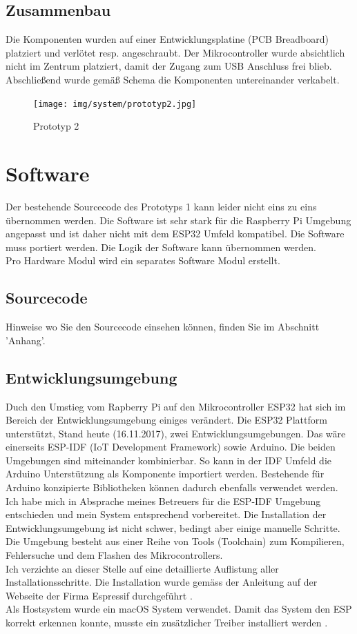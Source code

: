 \documentclass[11pt,english,german]{report}
\theoremstyle{definition}
\begin{document}
\newpage
\subsection{Zusammenbau}
Die Komponenten wurden auf einer Entwicklungsplatine (PCB Breadboard) platziert und verlötet resp. angeschraubt. Der Mikrocontroller wurde absichtlich nicht im Zentrum platziert, damit der Zugang zum USB Anschluss frei blieb. Abschließend wurde gemäß Schema die Komponenten untereinander verkabelt.\\
\begin{figure}[H]
	\centering
	\texttt{[image: img/system/prototyp2.jpg]}
	\caption[Prototyp 2]
	{Prototyp 2}
\end{figure}

\newpage
\section{Software}
Der bestehende Sourcecode des Prototyps 1 kann leider nicht eins zu eins übernommen werden. Die Software ist sehr stark für die Raspberry Pi Umgebung angepasst und ist daher nicht mit dem ESP32 Umfeld kompatibel. Die Software muss portiert werden. Die Logik der Software kann übernommen werden.\\[0.3cm]
Pro Hardware Modul wird ein separates Software Modul erstellt.

\subsection{Sourcecode}
Hinweise wo Sie den Sourcecode einsehen können, finden Sie im Abschnitt 'Anhang'.

\subsection{Entwicklungsumgebung}
Duch den Umstieg vom Rapberry Pi auf den Mikrocontroller ESP32 hat sich im Bereich der Entwicklungsumgebung einiges verändert. Die ESP32 Plattform unterstützt, Stand heute (16.11.2017), zwei Entwicklungsumgebungen. Das wäre einerseits ESP-IDF (IoT Development Framework) sowie Arduino\cite{espidfarduino}. Die beiden Umgebungen sind miteinander kombinierbar. So kann in der IDF Umfeld die Arduino Unterstützung als Komponente importiert werden. Bestehende für Arduino konzipierte Bibliotheken können dadurch ebenfalls verwendet werden. Ich habe mich in Absprache meines Betreuers für die ESP-IDF Umgebung entschieden und mein System entsprechend vorbereitet. Die Installation der Entwicklungsumgebung ist nicht schwer, bedingt aber einige manuelle Schritte. Die Umgebung besteht aus einer Reihe von Tools (Toolchain) zum Kompilieren, Fehlersuche und dem Flashen des Mikrocontrollers.\\[0.3cm]
Ich verzichte an dieser Stelle auf eine detaillierte Auflistung aller Installationsschritte. Die Installation wurde gemäss der Anleitung auf der Webseite der Firma Espressif durchgeführt \cite{espidfinstallation}.\\[0.3cm]
Als Hostsystem wurde ein macOS System verwendet. Damit das System den ESP korrekt erkennen konnte, musste ein zusätzlicher Treiber installiert werden \cite{espidfdriver}. 
\end{document}
